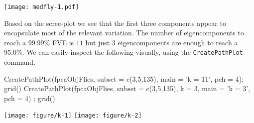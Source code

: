 \documentclass[11pt,english]{article}\usepackage[]{graphicx}\usepackage[]{color}
\begin{document}
\begin{minipage}[l]{0.5\textwidth}
\begin{Schunk}
\end{Schunk}
\end{minipage}
\begin{minipage}[r]{0.495\textwidth}
  \texttt{[image: medfly-1.pdf]}
\end{minipage} 

Based on the scree-plot we see that the first three components appear to encapsulate most of the relevant variation. The number of eigencomponents to reach a $99.99\%$ FVE is $11$ but just $3$ eigencomponents are enough to reach a $95.0\%$. We can easily inspect the following visually, using the \texttt{CreatePathPlot} command.
\begin{Schunk}
\begin{Sinput}
  CreatePathPlot(fpcaObjFlies, subset = c(3,5,135), main = 'k = 11', pch = 4); grid()
  CreatePathPlot(fpcaObjFlies, subset = c(3,5,135), k = 3, main = 'k = 3', pch = 4) ; grid()  
\end{Sinput}


{\centering \texttt{[image: figure/k-1]} \texttt{[image: figure/k-2]} 

}

\end{Schunk}

\end{document}

